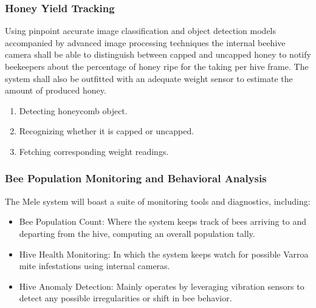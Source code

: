 \documentclass[12pt]{article}
\begin{document}
	\vspace{1 cm}
	\subsubsection{Honey Yield Tracking}
	Using pinpoint accurate image classification and object detection models accompanied by advanced image processing techniques the internal beehive camera shall be able to distinguish between capped and uncapped honey to notify beekeepers about the percentage of honey ripe for the taking per hive frame. The system shall also be outfitted with an adequate weight sensor to estimate the amount of produced honey.
	\begin{enumerate}
		\item Detecting honeycomb object.
		\item Recognizing whether it is capped or uncapped.
		\item Fetching corresponding weight readings.
	\end{enumerate}
	\newpage
	\subsubsection{Bee Population Monitoring and Behavioral Analysis}
	The Mele system will boast a suite of monitoring tools and diagnostics, including:
	\begin{itemize}
		\item Bee Population Count: 
		Where the system keeps track of bees arriving to and departing from the hive, computing an overall population tally.
		\item Hive Health Monitoring: 
		In which the system keeps watch for possible Varroa mite infestations using internal cameras.
		\item Hive Anomaly Detection: 
		Mainly operates by leveraging vibration sensors to detect any possible irregularities or shift in bee behavior.
	\end{itemize}
	
\end{document}
